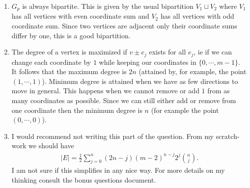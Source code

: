\begin{enumerate}
\begin{enumerate}
\begin{center}
\end{center}
        \item $G_p$ is always bipartite. This is given by the usual bipartition $V_1 \sqcup V_2$ where $V_1$ has all vertices with even coordinate sum and $V_2$ has all vertices with odd coordinate sum. Since two vertices are adjacent only their coordinate sums differ by one, this is a good bipartition.
        \item The degree of a vertex is maximized if $v \pm e_j$ exists for all $e_j$, ie if we can change each coordinate by $1$ while keeping our coordinates in $\{ 0 , \cdots, m-1 \}$. It follows that the maximum degree is $2n$ (attained by, for example, the point $(1, \cdots, 1)$). Minimum degree is attained when we have as few directions to move in general. This happens when we cannot remove or add $1$ from as many coordinates as possible. Since we can still either add or remove from one coordinate then the minimum degree is $n$ (for example the point $(0,\cdots, 0)$).
        \item I would recommend not writing this part of the question. From my scratch-work we should have
        \begin{align*}
            |E| = \frac{1}{2} \sum_{j=0}^n (2n - j) (m-2)^{n-j} 2^j \binom{n}{j}.
        \end{align*}
        I am not sure if this simplifies in any nice way. For more details on my thinking consult the bonus questions document.
    \end{enumerate}

\end{enumerate}
